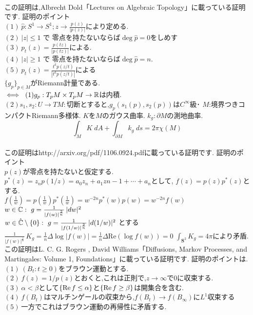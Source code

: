 \proof[代数トポロジー的な代数学の基本定理の証明]
\leavevmode\\
この証明は,Albrecht Dold「Lectures on Algebraic Topology」に載っている証明です.
証明のポイント\\
$(1) \ \hat{p}:S^1\to S^1 ; z \to \frac{p(z)}{|p(z)|}$により定める.\\
$(2)\ |z|\le 1$ で 零点を持たないならば$\deg \hat{p} = 0$をしめす\\
$(3)\ p_t(z) =  \frac{p(tz)}{|p(tz)|}$による.\\
$(4)\ |z|\ge 1$ で 零点を持たないならば$\deg \hat{p} = n$.\\
$(5)\ p_t(z) =  \frac{t^kp(z/t)}{|t^kp(z/t)|}$による\\
\proofx
{}
$\{g_p\}_{p\in M}$がRiemann計量である.\\
$\iff \ (1)g_p : T_p M \times T_p M \to \mathbb R $は内積.\\
$(2)s_1,s_2:U\to TM:$切断とすると,$g_p(s_1(p),s_2(p))$は$C^\infty$級･
\thm
$M$:境界つきコンパクトRiemann多様体. $K$を$M$のガウス曲率. $k_g:\partial M$の測地曲率.
\[
\int_M K\;dA+\int_{\partial M}k_g\;ds=2\pi\chi(M)
\]
\thmx
\proof[微分幾何学による代数学の基本定理の証明]
\leavevmode\\
この証明はhttp://arxiv.org/pdf/1106.0924.pdfに載っている証明です.
証明のポイント\\
$p(z)$が零点を持たないと仮定する.\\
$p^{*}(z) = z_np(1/z) = a_0z_n + a_1z{n-1} + \cdots + a_n$として, $f(z)=p(z)p^*(z)$とする.\\
$f(\tfrac{1}{w}) = p(\tfrac{1}{w})p^*(\tfrac{1}{w}) = w^{-2n}p^*(w)p(w) = w^{-2n}f(w)$\\
$w\in \C :\ g=\frac{1}{|f(w)|^{\frac{2}{n}}}\,|dw|^2$\\
$w\in \hat{\mathbb C} \setminus \{0\}:\  g=\frac{1}{|f(1/w)|^{\frac{2}{n}}}\,|d(1/w)|^2$ とする\\
$\frac{1}{|f(w)|^{\frac{1}{n}}}\,K_g=\frac{1}{n}\Delta \log|f(w)|=\frac{1}{n}\Delta \text{Re}(\log f(w))=0$
$\int_{\mathbf{S}^2}K_g=4\pi$により矛盾.
\proofx
{}
\proof[確率論による代数学の基本定理の証明]
この証明はL. C. G. Rogers , David Williams「Diffusions, Markov Processes, and Martingales: Volume 1, Foundations」に載っている証明です.
証明のポイントは.
$(1)\ (B_t:t \ge 0)$をブラウン運動とする.\\
$(2)\ f(z) = 1/p(z)$とおくと,これは正則で,$z\to\infty$で$0$に収束する.\\
$(3)\ \alpha < \beta$として$\{\mathop{\mathrm{Re}}\nolimits f \le \alpha\}$と$\{\mathop{\mathrm{Re}}\nolimits f \ge \beta\}$は開集合を含む.\\
$(4)\ f(B_t)$はマルチンゲールの収束から,$f(B_t)\to f(B_\infty)$に$L^1$収束する\\
$(5)\ $一方でこれはブラウン運動の再帰性に矛盾する.\\
\proofx
